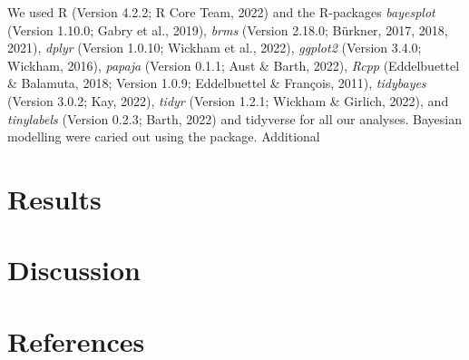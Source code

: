 \documentclass[
  man]{apa7}
\begin{document}
We used R (Version 4.2.2; R Core Team, 2022) and the R-packages \emph{bayesplot} (Version 1.10.0; Gabry et al., 2019), \emph{brms} (Version 2.18.0; Bürkner, 2017, 2018, 2021), \emph{dplyr} (Version 1.0.10; Wickham et al., 2022), \emph{ggplot2} (Version 3.4.0; Wickham, 2016), \emph{papaja} (Version 0.1.1; Aust \& Barth, 2022), \emph{Rcpp} (Eddelbuettel \& Balamuta, 2018; Version 1.0.9; Eddelbuettel \& François, 2011), \emph{tidybayes} (Version 3.0.2; Kay, 2022), \emph{tidyr} (Version 1.2.1; Wickham \& Girlich, 2022), and \emph{tinylabels} (Version 0.2.3; Barth, 2022) and tidyverse for all our analyses. Bayesian modelling were caried out using the package. Additional

\hypertarget{results}{%
\section{Results}\label{results}}

\hypertarget{discussion}{%
\section{Discussion}\label{discussion}}

\newpage

\hypertarget{references}{%
\section{References}\label{references}}
\end{document}
